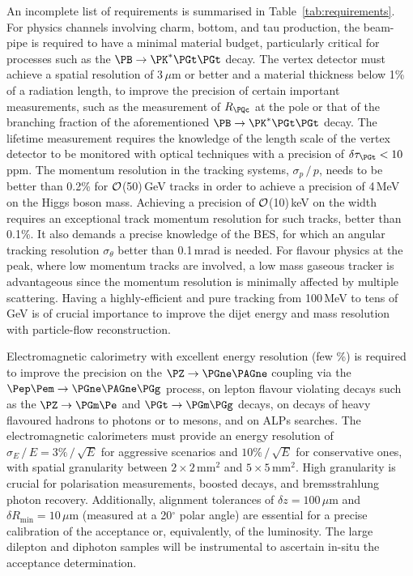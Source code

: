 An incomplete list of requirements is summarised in Table~\ref{tab:requirements}.
For physics channels involving charm, bottom, and tau production, the beam-pipe is required to have a minimal material budget, 
particularly critical for processes such as the $\PB \to \PK^\ast \PGt \PGt$ decay. 
The vertex detector must achieve a spatial resolution of 3\,$\mu$m or better and a material thickness below 1\% of a radiation length, 
to improve the precision of certain important measurements, 
such as the measurement of $R_{\PQc}$ at the \PZ pole or that of the branching fraction of the aforementioned $\PB \to \PK^\ast \PGt \PGt$ decay. 
The \PGt lifetime measurement requires the knowledge of the length scale of the vertex detector to be monitored with optical techniques with a precision of $\delta \tau_{\PGt} < 10$\,ppm. 
The momentum resolution in the tracking systems, $\sigma_p\,/\,p$, needs to be better than 0.2\% for ${\cal{O}}$(50)\,GeV tracks 
in order to achieve a precision of 4\,MeV on the Higgs boson mass. 
Achieving a precision of ${\cal{O}}$(10)\,keV on the \PZ width requires an exceptional track momentum resolution for such tracks, better than 0.1\%.
It also demands a precise knowledge of the BES, for which an angular tracking resolution $\sigma_\theta$ better than 0.1\,mrad is needed.
For flavour physics at the \PZ peak, where low momentum tracks are involved, 
a low mass gaseous tracker is advantageous since the momentum resolution is minimally affected by multiple scattering.
Having a highly-efficient and pure tracking from 100\,MeV to tens of GeV is of crucial importance to improve the dijet energy and mass resolution with particle-flow reconstruction.

Electromagnetic calorimetry with excellent energy resolution (few \%) is required to improve the precision 
on the $\PZ \to \PGne \PAGne$ coupling via the $\epem \to \PGne \PAGne \PGg$ process, 
on lepton flavour violating decays such as the $\PZ \to \PGm \Pe$ and $\PGt \to \PGm \PGg$ decays, 
on decays of heavy flavoured hadrons to photons or to \PGpz mesons, 
and on ALPs searches. 
The electromagnetic calorimeters must provide an energy resolution of $\sigma_E\,/\,E = 3\%\,/\,\sqrt{E}$
for aggressive scenarios and $10\%\,/\,\sqrt{E}$ for conservative ones, 
with spatial granularity between $2 \times 2$\,mm$^2$ and $5 \times 5$\,mm$^2$. 
High granularity is crucial for \PGt polarisation measurements, boosted \PGpz decays, and bremsstrahlung photon recovery. 
Additionally, alignment tolerances of $\delta z = 100$\,$\mu$m and $\delta R_\text{min} = 10$\,$\mu$m (measured at a 20$^\circ$ polar angle) 
are essential for a precise calibration of the acceptance or, equivalently, of the luminosity. 
The large dilepton and diphoton samples will be instrumental to ascertain in-situ the acceptance determination.

